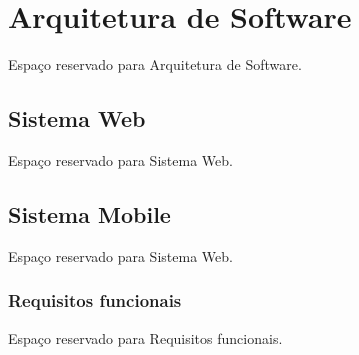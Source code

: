 \section{Arquitetura de Software}
Espaço reservado para Arquitetura de Software.

		\subsection{Sistema Web}
		
		Espaço reservado para Sistema Web.
		
		\subsection{Sistema Mobile}

		Espaço reservado para Sistema Web.
		
		
\subsubsection{Requisitos funcionais}
Espaço reservado para Requisitos funcionais.
                                                                                           